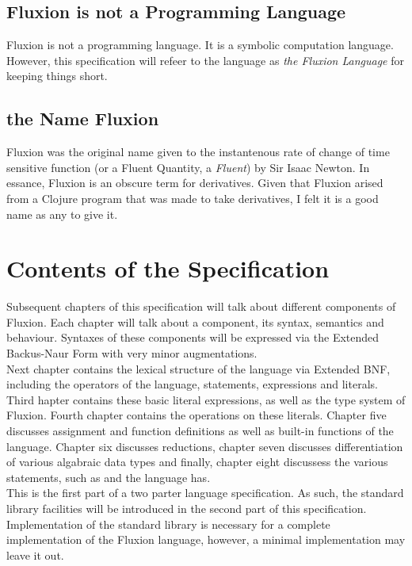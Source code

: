 \documentclass[11pt,a4paper]{book}
\begin{document}
\subsection*{Fluxion is not a Programming Language}

Fluxion is not a programming language. It is a symbolic computation language. However, this specification will refeer to the language as \textit{the Fluxion Language} for keeping things short.

\subsection*{the Name Fluxion}

Fluxion was the original name given to the instantenous rate of change of time sensitive function (or a Fluent Quantity, a \textit{Fluent}) by Sir Isaac Newton\cite{fluxionname}. In essance, Fluxion is an obscure term for derivatives\cite{collins}. Given that Fluxion arised from a Clojure program that was made to take derivatives, I felt it is a good name as any to give it.

\section*{Contents of the Specification}

Subsequent chapters of this specification will talk about different components of Fluxion. Each chapter will talk about a component, its syntax, semantics and behaviour. Syntaxes of these components will be expressed via the Extended Backus-Naur Form\cite{ISO14977} with very minor augmentations. \\

Next chapter contains the lexical structure of the language via Extended BNF, including the operators of the language, statements, expressions and literals. Third hapter contains these basic literal expressions, as well as the type system of Fluxion. Fourth chapter contains the operations on these literals. Chapter five discusses assignment and function definitions as well as built-in functions of the language. Chapter six discusses reductions, chapter seven discusses differentiation of various algabraic data types and finally, chapter eight discussess the various statements, such as  and  the language has. \\

This is the first part of a two parter language specification. As such, the standard library facilities will be introduced in the second part of this specification. Implementation of the standard library is necessary for a complete implementation of the Fluxion language, however, a minimal implementation may leave it out.
\end{document}
